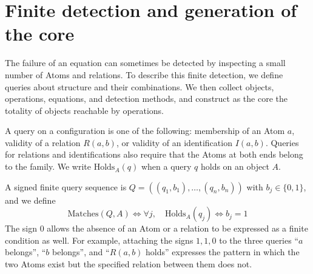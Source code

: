 \section{Finite detection and generation of the core}\label{sec:1.4}

The failure of an equation can sometimes be detected by inspecting a small number
of Atoms and relations. To describe this finite detection, we define queries
about structure and their combinations. We then collect objects, operations,
equations, and detection methods, and construct as the core the totality of
objects reachable by operations.

\begin{definition}\label{def:1.14}

A query on a configuration is one of the following: membership of an Atom $a$,
validity of a relation $R(a,b)$, or validity of an identification $I(a,b)$.
Queries for relations and identifications also require that the Atoms at both
ends belong to the family.
We write $\mathrm{Holds}_A(q)$ when a query $q$ holds on an object $A$.

A signed finite query sequence is $Q=((q_1,b_1),\ldots,(q_n,b_n))$ with
$b_j\in\{0,1\}$, and we define
\[
\mathrm{Matches}(Q,A)
\Longleftrightarrow
\forall j,\quad \mathrm{Holds}_A(q_j)\Longleftrightarrow b_j=1
\]
The sign $0$ allows the absence of an Atom or a relation to be expressed as a
finite condition as well.
For example, attaching the signs $1,1,0$ to the three queries ``$a$ belongs'',
``$b$ belongs'', and ``$R(a,b)$ holds'' expresses the pattern in which the two
Atoms exist but the specified relation between them does not.

\end{definition}

